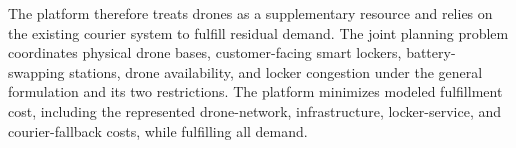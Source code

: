 \documentclass[final,3p,authoryear]{elsarticle}
\begin{document}
The platform therefore treats drones as a supplementary resource and relies on the existing courier system to fulfill residual demand.
The joint planning problem coordinates physical drone bases, customer-facing smart lockers, battery-swapping stations, drone availability, and locker congestion under the general formulation and its two restrictions.
The platform minimizes modeled fulfillment cost, including the represented drone-network, infrastructure, locker-service, and courier-fallback costs, while fulfilling all demand.
\end{document}
